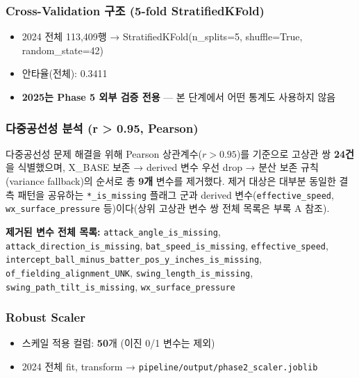 \documentclass[
  11.5pt,
]{article}
\providecommand{\tightlist}{%
  \setlength{\itemsep}{0pt}\setlength{\parskip}{0pt}}
\begin{document}
\subsubsection{Cross-Validation 구조 (5-fold
StratifiedKFold)}\label{cross-validation-uxad6cuxc870-5-fold-stratifiedkfold}

\begin{itemize}
\tightlist
\item
  2024 전체 113,409행 → StratifiedKFold(n\_splits=5, shuffle=True,
  random\_state=42)
\item
  안타율(전체): 0.3411
\item
  \textbf{2025는 Phase 5 외부 검증 전용} --- 본 단계에서 어떤 통계도
  사용하지 않음
\end{itemize}

\subsubsection{다중공선성 분석 (\textbar r\textbar{} \textgreater{}
0.95,
Pearson)}\label{uxb2e4uxc911uxacf5uxc120uxc131-uxbd84uxc11d-r-0.95-pearson}

다중공선성 문제 해결을 위해 Pearson 상관계수(\(r > 0.95\))를 기준으로
고상관 쌍 \textbf{24건}을 식별했으며, X\_BASE 보존 → derived 변수 우선
drop → 분산 보존 규칙(variance fallback)의 순서로 총 \textbf{9개} 변수를
제거했다. 제거 대상은 대부분 동일한 결측 패턴을 공유하는
\texttt{*\_is\_missing} 플래그 군과 derived
변수(\texttt{effective\_speed}, \texttt{wx\_surface\_pressure}
등)이다(상위 고상관 변수 쌍 전체 목록은 부록 A 참조).

\textbf{제거된 변수 전체 목록:} \texttt{attack\_angle\_is\_missing},
\texttt{attack\_direction\_is\_missing},
\texttt{bat\_speed\_is\_missing}, \texttt{effective\_speed},
\texttt{intercept\_ball\_minus\_batter\_pos\_y\_inches\_is\_missing},
\texttt{of\_fielding\_alignment\_UNK},
\texttt{swing\_length\_is\_missing},
\texttt{swing\_path\_tilt\_is\_missing}, \texttt{wx\_surface\_pressure}

\subsubsection{Robust Scaler}\label{robust-scaler}

\begin{itemize}
\tightlist
\item
  스케일 적용 컬럼: \textbf{50}개 (이진 0/1 변수는 제외)
\item
  2024 전체 fit, transform →
  \texttt{pipeline/output/phase2\_scaler.joblib}
\end{itemize}
\end{document}
